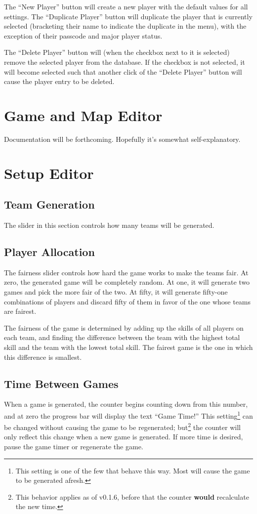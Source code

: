 \documentclass[10pt,a4paper]{report}
\begin{document}
The ``New Player'' button will create a new player with the default values for all settings.  The ``Duplicate Player'' button will duplicate the player that is currently selected (bracketing their name to indicate the duplicate in the menu), with the exception of their passcode and major player status.

The ``Delete Player'' button will (when the checkbox next to it is selected) remove the selected player from the database.  If the checkbox is not selected, it will become selected such that another click of the ``Delete Player'' button will cause the player entry to be deleted.

\chapter{Game and Map Editor}
Documentation will be forthcoming.  Hopefully it's somewhat self-explanatory.

\chapter{Setup Editor}
\section{Team Generation}
The slider in this section controls how many teams will be generated.

\section{Player Allocation}
The fairness slider controls how hard the game works to make the teams fair.  At zero, the generated game will be completely random.  At one, it will generate two games and pick the more fair of the two.  At fifty, it will generate fifty-one combinations of players and discard fifty of them in favor of the one whose teams are fairest.

The fairness of the game is determined by adding up the skills of all players on each team, and finding the difference between the team with the highest total skill and the team with the lowest total skill.  The fairest game is the one in which this difference is smallest.

\section{Time Between Games}
When a game is generated, the counter begins counting down from this number, and at zero the progress bar will display the text ``Game Time!''  This setting\footnote{This setting is one of the few that behave this way.  Most will cause the game to be generated afresh.} can be changed without causing the game to be regenerated; but\footnote{This behavior applies as of v0.1.6, before that the counter \textbf{would} recalculate the new time.} the counter will only reflect this change when a new game is generated.  If more time is desired, pause the game timer or regenerate the game.
\end{document}
